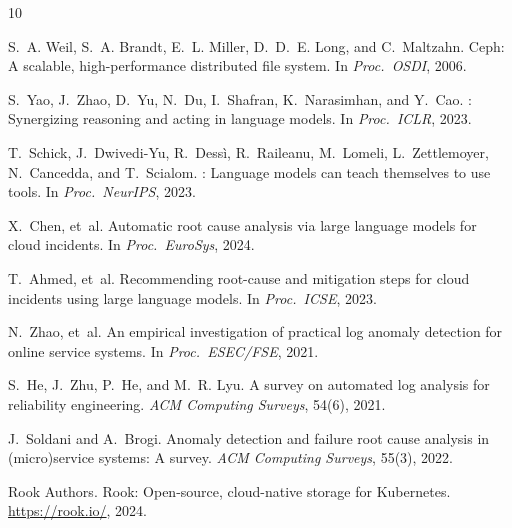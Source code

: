\documentclass[sigplan,nonacm,10pt]{acmart}
\begin{document}
\begin{thebibliography}{10}

S.~A. Weil, S.~A. Brandt, E.~L. Miller, D.~D.~E. Long, and C.~Maltzahn.
\newblock Ceph: A scalable, high-performance distributed file system.
\newblock In \emph{Proc.\ OSDI}, 2006.

S.~Yao, J.~Zhao, D.~Yu, N.~Du, I.~Shafran, K.~Narasimhan, and Y.~Cao.
: Synergizing reasoning and acting in language models.
\newblock In \emph{Proc.\ ICLR}, 2023.

T.~Schick, J.~Dwivedi-Yu, R.~Dess\`{i}, R.~Raileanu, M.~Lomeli,
  L.~Zettlemoyer, N.~Cancedda, and T.~Scialom.
: Language models can teach themselves to use tools.
\newblock In \emph{Proc.\ NeurIPS}, 2023.

X.~Chen, et~al.
\newblock Automatic root cause analysis via large language models for cloud
  incidents.
\newblock In \emph{Proc.\ EuroSys}, 2024.

T.~Ahmed, et~al.
\newblock Recommending root-cause and mitigation steps for cloud incidents
  using large language models.
\newblock In \emph{Proc.\ ICSE}, 2023.

N.~Zhao, et~al.
\newblock An empirical investigation of practical log anomaly detection for
  online service systems.
\newblock In \emph{Proc.\ ESEC/FSE}, 2021.

S.~He, J.~Zhu, P.~He, and M.~R. Lyu.
\newblock A survey on automated log analysis for reliability engineering.
\newblock \emph{ACM Computing Surveys}, 54(6), 2021.

J.~Soldani and A.~Brogi.
\newblock Anomaly detection and failure root cause analysis in (micro)service
  systems: A survey.
\newblock \emph{ACM Computing Surveys}, 55(3), 2022.

Rook Authors.
\newblock Rook: Open-source, cloud-native storage for {Kubernetes}.
\newblock \url{https://rook.io/}, 2024.

\end{thebibliography}
\end{document}
